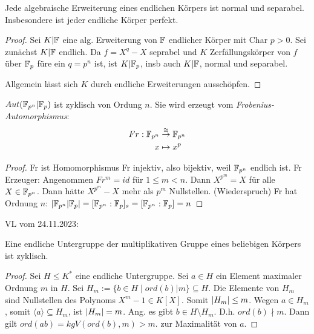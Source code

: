 \documentclass[../main.tex]{subfiles}
\begin{document}
\begin{corollary}
    Jede algebraische Erweiterung eines endlichen Körpers ist normal und separabel. Insbesondere ist jeder endliche Körper perfekt.
\end{corollary}
\begin{proof}
    Sei $K|\mathbb{F}$ eine alg. Erweiterung von $\mathbb{F}$ endlicher Körper mit Char $p>0$. Sei zunächst $K|\mathbb{F}$ endlich.
     Da $f=X^q-X$ seprabel und $K$ Zerfällungskörper von $f$ über $\mathbb{F}_p$ füre ein $q=p^n$ ist, ist $K|\mathbb{F}_p$, insb auch $K|\mathbb{F}$, normal und separabel.

     Allgemein lässt sich $K$ durch endliche Erweiterungen ausschöpfen.
\end{proof}
\begin{theorem}
    $Aut(\mathbb{F}_{p^n}| \mathbb{F}_p)$ ist zyklisch von Ordung $n$. Sie wird erzeugt vom \emph{Frobenius-Automorphismus}:
    \begin{align*}
        Fr: \mathbb{F}_{p^n} &\overset{\cong}{\rightarrow}\mathbb{F}_{p^n}\\
        x&\mapsto x^p
    \end{align*}
\end{theorem}
\begin{proof}
    Fr ist Homomorphismus
    Fr injektiv, also bijektiv, weil $\mathbb{F}_{p^n}$ endlich ist.
    Fr Erzeuger: Angenommen $Fr^m = id$ für $1\leq m<n$. Dann $X^{p^m} = X$ für alle $X\in \mathbb{F}_{p^n}$. Dann hätte $X^{p^m}-X$ mehr als $p^m$ Nullstellen. (Wiederspruch)
    Fr hat Ordnung $n$: $\left\vert \mathbb{F}_{p^n} | \mathbb{F}_p \right\vert = [\mathbb{F}_{p^n} :\mathbb{F}_p]_s = [\mathbb{F}_{p^n}:\mathbb{F}_p] = n$
\end{proof}
\begin{flushright}
VL vom 24.11.2023:
\end{flushright}
\begin{theorem} \label{theo:2.55}
    Eine endliche Untergruppe der multiplikativen Gruppe eines beliebigen Körpers ist zyklisch.
\end{theorem}
\begin{proof}
    Sei $H\leq K^*$ eine endliche Untergruppe.
    Sei $a\in H$ ein Element maximaler Ordnung $m$ in $H$.
    Sei $H_m := \{b\in H\mid ord(b)|m\} \subseteq H$.
    Die Elemente von $H_m$ sind Nullstellen des Polynoms $X^m-1\in K[X]$.
    Somit $\left\vert H_m \right\vert\leq m$. Wegen $a\in H_m$, somit $\langle a\rangle\subseteq H_m$, ist $\left\vert H_m \right\vert=m$.
    Ang. es gibt $b\in H\setminus H_m$. D.h. $ord(b)\nmid m$.
    Dann gilt $ord(ab)= kgV(ord(b),m) >m$.
    \Lightning zur Maximalität von $a$.
\end{proof}
\end{document}
